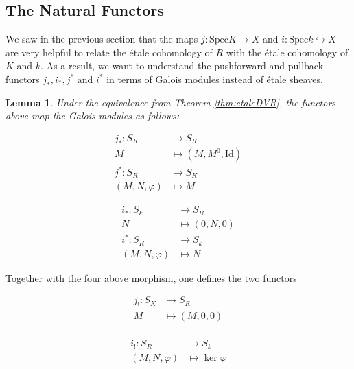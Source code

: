 \documentclass{article}
\newcommand{\Spec}{\mathrm{Spec}}
\newcommand{\Id}{\mathrm{Id}}
\theoremstyle{plain}
\newtheorem{lemma}[theorem]{Lemma}
\theoremstyle{definition}
\begin{document}
    \subsection{The Natural Functors}\label{sec:naturalfunc}
    We saw in the previous section that the maps $j:\Spec K\to X$ and $i:\Spec k\hookrightarrow X$ are very helpful to relate the \'{e}tale cohomology of $R$ with the \'{e}tale cohomology of $K$ and $k$. As a result, we want to understand the pushforward and pullback functors $j_*,i_*,j^*$ and $i^*$ in terms of Galois modules instead of \'{e}tale sheaves. 
    \begin{lemma}
        Under the equivalence from Theorem \ref{thm:etaleDVR}, the functors above map the Galois modules as follows:

        \begin{minipage}{0.35\textwidth}
            \begin{align*}
                j_*:S_K&\longrightarrow S_R\\
                M&\longmapsto(M,M^0,\Id)\\
                j^*:S_R&\longrightarrow S_K\\
                (M,N,\varphi)&\longmapsto M
            \end{align*}
        \end{minipage}
        \begin{minipage}{0.35\textwidth}
            \begin{align*}
                i_*:S_k&\longrightarrow S_R\\
                N&\longmapsto(0,N,0)\\
                i^*:S_R&\longrightarrow S_k\\
                (M,N,\varphi)&\longmapsto N
            \end{align*}
        \end{minipage} 
    \end{lemma}

    Together with the four above morphism, one defines the two functors 

    \begin{minipage}{0.35\textwidth}
        \begin{align*}
            j_!:S_K&\longrightarrow S_R\\
            M&\longmapsto(M,0,0)\\
        \end{align*}
    \end{minipage}
    \begin{minipage}{0.35\textwidth}
        \begin{align*}
            i_!:S_R&\longrightarrow S_k\\
            (M,N,\varphi)&\longmapsto\ker\varphi\\
        \end{align*}
    \end{minipage} 
\end{document}
